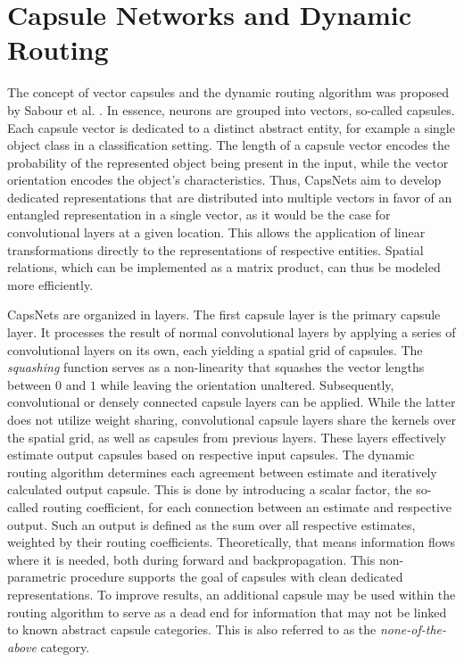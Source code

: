 \documentclass{article}
\begin{document}
\section{Capsule Networks and Dynamic Routing}
\label{lab:capsules}
The concept of vector capsules and the dynamic routing algorithm was proposed by Sabour et al. .
In essence, neurons are grouped into vectors, so-called capsules. Each capsule vector is dedicated to a distinct abstract entity, for example a single object class in a classification setting. The length of a capsule vector encodes the probability of the represented object being present in the input, while the vector orientation encodes the object's characteristics. Thus, CapsNets aim to develop dedicated representations that are distributed into multiple vectors in favor of an entangled representation in a single vector, as it would be the case for convolutional layers at a given location. This allows the application of linear transformations directly to the representations of respective entities. Spatial relations, which can be implemented as a matrix product, can thus be modeled more efficiently.

CapsNets are organized in layers. The first capsule layer is the primary capsule layer. It processes the result of normal convolutional layers by applying a series of convolutional layers on its own, each yielding a spatial grid of capsules. The \textit{squashing} function serves as a non-linearity that squashes the vector lengths between $0$ and $1$ while leaving the orientation unaltered.
Subsequently, convolutional or densely connected capsule layers can be applied. While the latter does not utilize weight sharing, convolutional capsule layers share the kernels over the spatial grid, as well as capsules from previous layers. 
These layers effectively estimate output capsules based on respective input capsules. The dynamic routing algorithm determines each agreement between estimate and iteratively calculated output capsule. This is done by introducing a scalar factor, the so-called routing coefficient, for each connection between an estimate and respective output. Such an output is defined as the sum over all respective estimates, weighted by their routing coefficients. Theoretically, that means information flows where it is needed, both during forward and backpropagation. This non-parametric procedure supports the goal of capsules with clean dedicated representations. To improve results, an additional capsule may be used within the routing algorithm to serve as a dead end for information that may not be linked to known abstract capsule categories. This is also referred to as the \emph{none-of-the-above} category.
\end{document}
